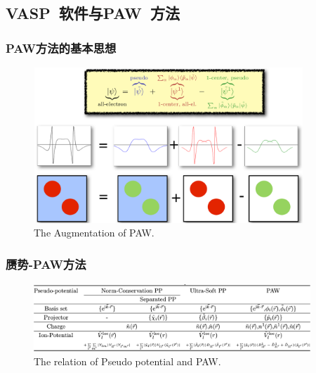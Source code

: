 \documentclass[cjk,slidestop,compress,mathserif,blue]{beamer}
\begin{document}
\subsection{\rm{VASP~}软件与\rm{PAW~}方法}
\frame
{
	\frametitle{\textrm{PAW}方法的基本思想}
\begin{figure}[h!]
\centering
\includegraphics[height=2.3in,width=4.0in,viewport=0 0 1280 745,clip]{Figures/PAW-baseset.png}
\caption{\tiny \textrm{The Augmentation of PAW.}}%
\label{PAW_baseset}
\end{figure}
}

\frame
{
	\frametitle{赝势-\textrm{PAW}方法}
\begin{figure}[h!]
\centering
\includegraphics[height=1.0in,width=4.1in,clip]{Figures/Pseudo-Potential.png}
\caption{\tiny \textrm{The relation of Pseudo potential and PAW.}}%
\label{Pseudo_Poential}
\end{figure}
}
\end{document}
